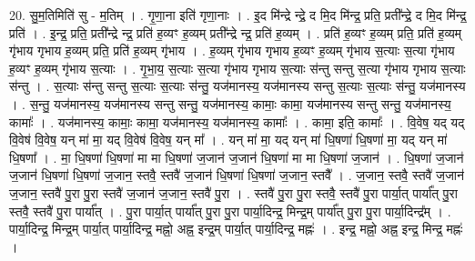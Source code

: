 \documentclass[17pt]{extarticle}
\begin{document}
20. सु॒म॒तिमिति॑ सु - म॒तिम् । . गृ॒णा॒ना इति॑ गृणा॒नाः । . इ॒द मि॑न्द्रे न्द्रे॒ द मि॒द मि॑न्द्र॒ प्रति॒ प्रती᳚न्द्रे॒ द मि॒द मि॑न्द्र॒ प्रति॑ । . इ॒न्द्र॒ प्रति॒ प्रती᳚न्द्रे न्द्र॒ प्रति॑ ह॒व्यꣳ ह॒व्यम् प्रती᳚न्द्रे न्द्र॒ प्रति॑ ह॒व्यम् । . प्रति॑ ह॒व्यꣳ ह॒व्यम् प्रति॒ प्रति॑ ह॒व्यम् गृ॑भाय गृभाय ह॒व्यम् प्रति॒ प्रति॑ ह॒व्यम् गृ॑भाय । . ह॒व्यम् गृ॑भाय गृभाय ह॒व्यꣳ ह॒व्यम् गृ॑भाय स॒त्याः स॒त्या गृ॑भाय ह॒व्यꣳ ह॒व्यम् गृ॑भाय स॒त्याः । . गृ॒भा॒य॒ स॒त्याः स॒त्या गृ॑भाय गृभाय स॒त्याः स॑न्तु सन्तु स॒त्या गृ॑भाय गृभाय स॒त्याः स॑न्तु । . स॒त्याः स॑न्तु सन्तु स॒त्याः स॒त्याः स॑न्तु॒ यज॑मानस्य॒ यज॑मानस्य सन्तु स॒त्याः स॒त्याः स॑न्तु॒ यज॑मानस्य । . स॒न्तु॒ यज॑मानस्य॒ यज॑मानस्य सन्तु सन्तु॒ यज॑मानस्य॒ कामाः॒ कामा॒ यज॑मानस्य सन्तु सन्तु॒ यज॑मानस्य॒ कामाः᳚ । . यज॑मानस्य॒ कामाः॒ कामा॒ यज॑मानस्य॒ यज॑मानस्य॒ कामाः᳚ । . कामा॒ इति॒ कामाः᳚ । . वि॒वेष॒ यद् यद् वि॒वेष॑ वि॒वेष॒ यन् मा॑ मा॒ यद् वि॒वेष॑ वि॒वेष॒ यन् मा᳚ । . यन् मा॑ मा॒ यद् यन् मा॑ धि॒षणा॑ धि॒षणा॑ मा॒ यद् यन् मा॑ धि॒षणा᳚ । . मा॒ धि॒षणा॑ धि॒षणा॑ मा मा धि॒षणा॑ ज॒जान॑ ज॒जान॑ धि॒षणा॑ मा मा धि॒षणा॑ ज॒जान॑ । . धि॒षणा॑ ज॒जान॑ ज॒जान॑ धि॒षणा॑ धि॒षणा॑ ज॒जान॒ स्तवै॒ स्तवै॑ ज॒जान॑ धि॒षणा॑ धि॒षणा॑ ज॒जान॒ स्तवै᳚ । . ज॒जान॒ स्तवै॒ स्तवै॑ ज॒जान॑ ज॒जान॒ स्तवै॑ पु॒रा पु॒रा स्तवै॑ ज॒जान॑ ज॒जान॒ स्तवै॑ पु॒रा । . स्तवै॑ पु॒रा पु॒रा स्तवै॒ स्तवै॑ पु॒रा पार्या॒त् पार्या᳚त् पु॒रा स्तवै॒ स्तवै॑ पु॒रा पार्या᳚त् । . पु॒रा पार्या॒त् पार्या᳚त् पु॒रा पु॒रा पार्या॒दिन्द्र॒ मिन्द्र॒म् पार्या᳚त् पु॒रा पु॒रा पार्या॒दिन्द्र᳚म् । . पार्या॒दिन्द्र॒ मिन्द्र॒म् पार्या॒त् पार्या॒दिन्द्र॒ मह्नो॒ अह्न॒ इन्द्र॒म् पार्या॒त् पार्या॒दिन्द्र॒ मह्नः॑ । . इन्द्र॒ मह्नो॒ अह्न॒ इन्द्र॒ मिन्द्र॒ मह्नः॑ । \newline
\end{document}
